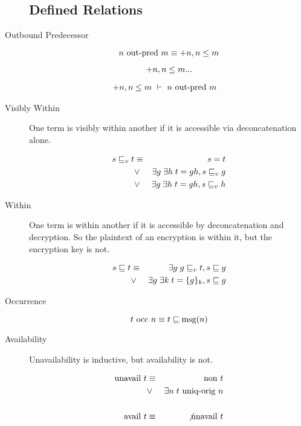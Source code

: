 \documentclass{article}
\begin{document}
\begin{description}
\subsection{Defined Relations}

\item[Outbound Predecessor]
$$ n \mbox{ out-pred } m \equiv +n, n \leq m $$

$$ +n, n \leq m ... $$

\begin{align*}
+n, n \leq m & \ \vdash\ n \mbox{ out-pred } m
\end{align*}

\item[Visibly Within]

One term is visibly within another if it is accessible via
deconcatenation alone.

\begin{eqnarray*}
s \sqsubseteq_v t &\equiv& s = t \\
&\vee& \exists g\; \exists h\; t = g h, s \sqsubseteq_v g \\
&\vee& \exists g\; \exists h\; t = g h, s \sqsubseteq_v h
\end{eqnarray*}

\item[Within]

One term is within another if it is accessible by deconcatenation and
decryption.  So the plaintext of an encryption is within it, but the
encryption key is not.

\begin{eqnarray*}
s \sqsubseteq t &\equiv& \exists g\; g \sqsubseteq_v t, s \sqsubseteq g \\
&\vee& \exists g\; \exists k\; t = \{g\}_{k}, s \sqsubseteq g
\end{eqnarray*}

\item[Occurrence]

$$ t \mbox{ occ } n \equiv t \sqsubseteq \mbox{msg}(n) $$

\item[Availability]

Unavailability is inductive, but availability is not.

\begin{eqnarray*}
\mbox{unavail } t &\equiv& \mbox{non } t \\
&\vee& \exists n\; t \mbox{ uniq-orig } n \\
\\
\mbox{avail } t &\equiv& \not \mbox{unavail } t
\end{eqnarray*}


\end{description}
\end{document}
